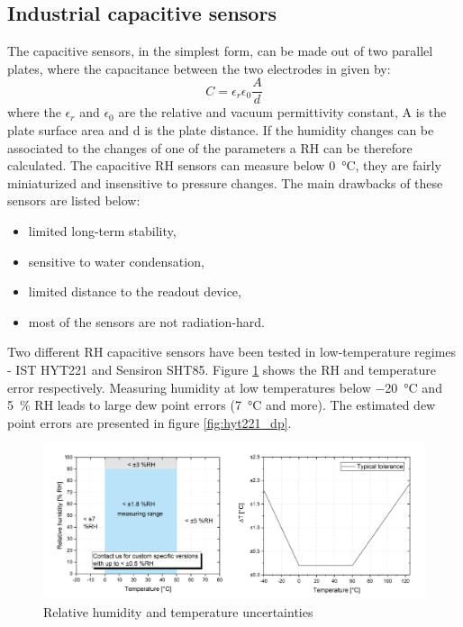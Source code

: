 \subsection{Industrial capacitive sensors}
The capacitive sensors, in the simplest form, can be made out of two parallel plates, where the capacitance between the two electrodes in given by:
\begin{equation}
C = \epsilon_{r}\epsilon_0\frac{A}{d}
\end{equation}
where the $\epsilon_{r}$ and $\epsilon_{0}$ are the relative and vacuum permittivity constant, A is the plate surface area and d is the plate distance. If the humidity changes can be associated to the changes of one of the parameters a \gls{RH} can be therefore calculated. 
The capacitive \gls{RH} sensors can measure below \SI{0}{\celsius}, they are fairly miniaturized and insensitive to pressure changes. The main drawbacks of these sensors are listed below:
\begin{itemize}
    \item limited long-term stability,
    \item sensitive to water condensation,
    \item limited distance to the readout device,
    \item most of the sensors are not radiation-hard.
\end{itemize}
Two different \gls{RH} capacitive sensors have been tested in low-temperature regimes - IST HYT221 and Sensiron SHT85. Figure \ref{fig:hyt221} shows the \gls{RH} and temperature error respectively. Measuring humidity at low temperatures below \SI{-20}{\celsius} and 5~\% \gls{RH} leads to large dew point errors (\SI{7}{\celsius} and more). The estimated dew point errors are presented in figure \ref{fig:hyt221_dp}.
\begin{figure}[!h]
\centering
\includegraphics[width=0.85\columnwidth]{Chapter5/images/hyt221_rh.png}
\caption{Relative humidity and temperature uncertainties \cite{hyt221}}
\label{fig:hyt221}
\end{figure}
